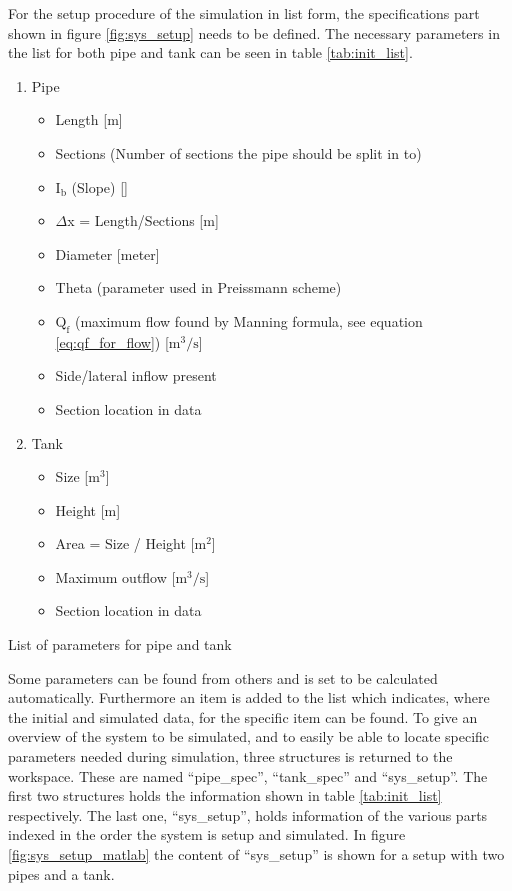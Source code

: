 For the setup procedure of the simulation in list form, the specifications part shown in figure \ref{fig:sys_setup} needs to be defined. The necessary parameters in the list for both pipe and tank can be seen in table \ref{tab:init_list}. 
\begin{table}[H]
\begin{enumerate} 
	\item Pipe
	\begin{itemize}
		\item Length [m]
		\item Sections (Number of sections the pipe should be split in to)
		\item $\text{I}_\text{b}$ (Slope) [\textperthousand]
		\item $\Delta$x = Length/Sections [m]
		\item Diameter [meter]
		\item Theta (parameter used in Preissmann scheme)
		\item $\text{Q}_{\text{f}}$ (maximum flow found by Manning formula, see equation \ref{eq:qf_for_flow}) [$\text{m}^\text{3}/\text{s}$]
		\item Side/lateral inflow present 
		\item Section location in data 
	\end{itemize}
	\item Tank
	\begin{itemize}
		\item Size [$\text{m}^\text{3}$]
		\item Height [m]
		\item Area = Size / Height [$\text{m}^\text{2}$]
		\item Maximum outflow [$\text{m}^\text{3}/\text{s}$]
		\item Section location in data 
	\end{itemize}
	
\end{enumerate}
\caption{List of parameters for pipe and tank}
\label{tab:init_list}
\end{table}
Some parameters can be found from others and is set to be calculated automatically. 
Furthermore an item is added to the list which indicates, where the initial and simulated data, for the specific item can be found.
To give an overview of the system to be simulated, and to easily be able to locate specific parameters needed during simulation, three structures is returned to the workspace. These are named ``pipe\_spec'', ``tank\_spec'' and ``sys\_setup''. The first two structures holds the information shown in table \ref{tab:init_list} respectively. The last one, ``sys\_setup'', holds information of the various parts indexed in the order the system is setup and simulated. In figure \ref{fig:sys_setup_matlab} the content of ``sys\_setup'' is shown for a setup with two pipes and a tank.

